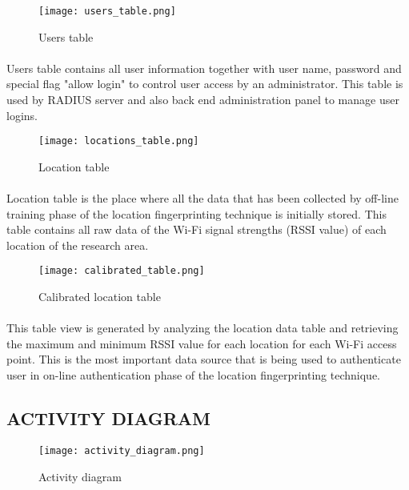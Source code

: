 \begin{figure}[h]	
	\centering
	\texttt{[image: users\_table.png]}
	\caption{Users table}
\end{figure}

\newpage
\paragraph{}
Users table contains all user information together with user name, password and special flag "allow login" to control user access by an administrator. This table is used by RADIUS server and also back end administration panel to manage user logins. 

\begin{figure}[h]	
	\centering
	\texttt{[image: locations\_table.png]}
	\caption{Location table}
\end{figure}
\paragraph{}
Location table is the place where all the data that has been collected by off-line training phase of the location fingerprinting technique is initially stored. This table contains all raw data of the Wi-Fi signal strengths (RSSI value) of each location of the research area. 

\begin{figure}[h]	
	\centering
	\texttt{[image: calibrated\_table.png]}
	\caption{Calibrated location table}
\end{figure}

\newpage
\paragraph{}
This table view is generated by analyzing the location data table and retrieving the maximum and minimum RSSI value for each location for each Wi-Fi access point. This is the most important data source that is being used to authenticate user in on-line authentication phase of the location fingerprinting technique.

\subsection{ACTIVITY DIAGRAM}

\begin{figure}[h]	
	\centering
	\texttt{[image: activity\_diagram.png]}
	\caption{Activity diagram}
\end{figure}

